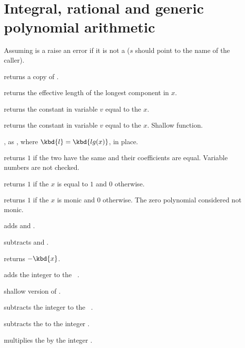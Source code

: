 \section{Integral, rational and generic polynomial arithmetic}


 Assuming  is a 
raise an error if it is not a  ($s$ should point to the name of the
caller).

 returns a copy of .

 returns the effective length of the longest
component in $x$.

 returns the constant  in variable
$v$ equal to the  $x$.

 returns the constant  in
variable $v$ equal to the  $x$. Shallow function.

, as , where
$\kbd{l} = \kbd{lg(x)}$, in place.

 returns $1$ if the two  have
the same  and their coefficients are equal. Variable numbers are
not checked.

 returns $1$ if the  $x$ is equal to $1$
and $0$ otherwise.

 returns $1$ if the  $x$ is monic and $0$
otherwise.  The zero polynomial considered not monic.

 adds  and .

 subtracts  and .

 returns $-\kbd{x}$.

 adds the integer  to the
~.

 shallow version of .

 subtracts the integer  to the
~.

 subtracts the   to the
integer .

 multiplies the   by the
integer .

